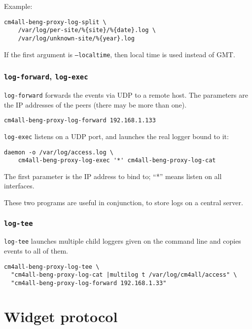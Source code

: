 \documentclass[a4paper,12pt]{article}
\begin{document}
Example:

\begin{verbatim}
cm4all-beng-proxy-log-split \
    /var/log/per-site/%{site}/%{date}.log \
    /var/log/unknown-site/%{year}.log
\end{verbatim}

If the first argument is \texttt{--localtime}, then local time is used
instead of GMT.

\subsubsection{\texttt{log-forward}, \texttt{log-exec}}

\texttt{log-forward} forwards the events via UDP to a remote host.
The parameters are the IP addresses of the peers (there may be more
than one).

\begin{verbatim}
cm4all-beng-proxy-log-forward 192.168.1.133
\end{verbatim}

\texttt{log-exec} listens on a UDP port, and launches the real logger
bound to it:

\begin{verbatim}
daemon -o /var/log/access.log \
    cm4all-beng-proxy-log-exec '*' cm4all-beng-proxy-log-cat
\end{verbatim}

The first parameter is the IP address to bind to; ``*'' means listen
on all interfaces.

These two programs are useful in conjunction, to store logs on a
central server.

\subsubsection{\texttt{log-tee}}

\texttt{log-tee} launches multiple child loggers given on the command
line and copies events to all of them.

\begin{verbatim}
cm4all-beng-proxy-log-tee \
  "cm4all-beng-proxy-log-cat |multilog t /var/log/cm4all/access" \
  "cm4all-beng-proxy-log-forward 192.168.1.33"
\end{verbatim}


\section{Widget protocol}
\end{document}
